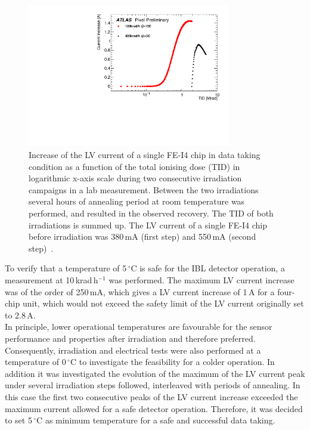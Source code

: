 \begin{figure}[h!]
\centering
\includegraphics[width=3.5in]{figures/ElectronicsChapter/ATLAS/MixedIrradiaiton.pdf}
\caption{Increase of the LV current of a single FE-I4 chip in data taking condition as a function of the total ionising dose (TID) in logarithmic x-axis scale during two consecutive irradiation campaigns in a lab measurement. Between the two irradiations several hours of annealing period at room temperature was performed, and resulted in the observed recovery. The TID of both irradiations is summed up. The LV current of a single FE-I4 chip before irradiation was 380\,mA (first step) and 550\,mA (second step)~\cite{TaskForceNote}.}
\label{fig:MixedIrradiaiton}
\end{figure} 
%
To verify that a temperature of 5\,$^\circ$C is safe for the IBL detector operation, a measurement  at 10\,krad\,h$^{-1}$ was performed. The maximum LV current increase was of the order of 250\,mA, which gives a LV current increase of 1\,A for a four-chip unit, which would not exceed the safety limit of the LV current originally set to 2.8\,A.\\
In principle, lower operational temperatures are favourable for the sensor performance and properties after irradiation and therefore preferred. Consequently, irradiation and electrical tests were also performed at a temperature of 0\,$^\circ$C to investigate the feasibility for a colder operation.
In addition it was investigated the evolution of the maximum of the LV current peak under several irradiation steps followed, interleaved with periods of annealing.
In this case the first two consecutive peaks of the LV current increase exceeded the maximum current allowed for a safe detector operation. Therefore, it was decided to set 5\,$^\circ$C as minimum temperature for a safe and successful data taking.


